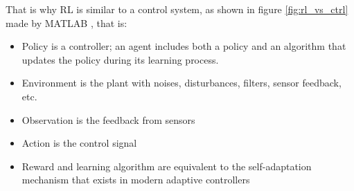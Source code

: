 \documentclass[../main.tex]{subfiles}
\begin{document}
That is why RL is similar to a control system, as shown in figure \ref{fig:rl_vs_ctrl} made by MATLAB \cite{MathWorksRLControlSystems}, that is:
\begin{itemize}
    \item Policy is a controller; an agent includes both a policy and an algorithm that updates the policy during its learning process.
    \item Environment is the plant with noises, disturbances, filters, sensor feedback, etc.
    \item Observation is the feedback from sensors
    \item Action is the control signal
    \item Reward and learning algorithm are equivalent to the self-adaptation mechanism that exists in modern adaptive controllers
\end{itemize}
\end{document}
